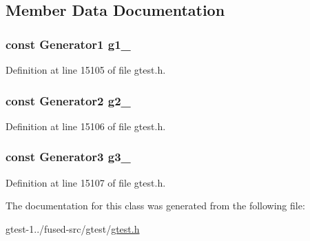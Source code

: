\subsection{\-Member \-Data \-Documentation}
\hypertarget{classtesting_1_1internal_1_1CartesianProductHolder3_a36a04c8f9e515291d6a093ab378084f7}{
\subsubsection[{g1\-\_\-}]{\setlength{\rightskip}{0pt plus 5cm}const \-Generator1 {\bf g1\-\_\-}}}\label{d4/d98/classtesting_1_1internal_1_1CartesianProductHolder3_a36a04c8f9e515291d6a093ab378084f7}


\-Definition at line 15105 of file gtest.\-h.

\hypertarget{classtesting_1_1internal_1_1CartesianProductHolder3_a6cfd9fa9a396d07747d5ebb1f05c7f22}{
\subsubsection[{g2\-\_\-}]{\setlength{\rightskip}{0pt plus 5cm}const \-Generator2 {\bf g2\-\_\-}}}\label{d4/d98/classtesting_1_1internal_1_1CartesianProductHolder3_a6cfd9fa9a396d07747d5ebb1f05c7f22}


\-Definition at line 15106 of file gtest.\-h.

\hypertarget{classtesting_1_1internal_1_1CartesianProductHolder3_a79088ad1a5d8e0e316bd20057b9cfb3f}{
\subsubsection[{g3\-\_\-}]{\setlength{\rightskip}{0pt plus 5cm}const \-Generator3 {\bf g3\-\_\-}}}\label{d4/d98/classtesting_1_1internal_1_1CartesianProductHolder3_a79088ad1a5d8e0e316bd20057b9cfb3f}


\-Definition at line 15107 of file gtest.\-h.



\-The documentation for this class was generated from the following file\-:\begin{DoxyCompactItemize}
\item 
gtest-\/1../fused-\/src/gtest/\hyperlink{fused-src_2gtest_2gtest_8h}{gtest.\-h}\end{DoxyCompactItemize}
